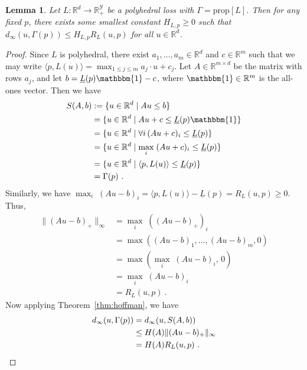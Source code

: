 \documentclass[11pt]{article}
\newcommand{\reals}{\mathbb{R}}
\newcommand{\prop}[1]{\mathrm{prop}[#1]}
\newcommand{\Y}{\mathcal{Y}}
\newcommand{\risk}[1]{\underline{#1}}
\newcommand{\inprod}[2]{\langle #1, #2 \rangle}%
\newcommand{\ones}{\mathbbm{1}}
\newcommand{\regret}[3]{R_{#1}(#2,#3)}
\newtheorem{lemma}{Lemma}
\begin{document}
\begin{lemma}\label{lemma:hoffman-polyhedral}
  Let $L: \reals^d \to \reals_+^{\Y}$ be a polyhedral loss with $\Gamma = \prop{L}$.
  Then for any fixed $p$, there exists some smallest constant $H_{L,p} \geq 0$ such that $d_{\infty}(u,\Gamma(p)) \leq H_{L,p} R_L(u,p)$ for all $u \in \reals^d$.
\end{lemma}
\begin{proof}
  Since $L$ is polyhedral, there exist $a_1,\ldots,a_m \in \reals^d$ and $c\in\reals^m$ such that we may write $\inprod{p}{L(u)} = \max_{1\leq j\leq m} a_j \cdot u + c_j$.
  Let $A \in \reals^{m\times d}$ be the matrix with rows $a_j$, and let $b = \risk{L}(p)\ones - c$, where $\ones\in\reals^m$ is the all-ones vector.
  Then we have
  \begin{align*}
    S(A,b)
    &:= \{u\in\reals^d \mid A u \leq b\}
    \\
    &= \{u\in\reals^d \mid A u + c \leq \risk{L}(p)\ones\}
    \\
    &= \{u\in\reals^d \mid \forall i\, (A u + c)_i \leq \risk{L}(p)\}
    \\
    &= \{u\in\reals^d \mid \max_i \;(A u + c)_i \leq \risk{L}(p)\}
    \\
    &= \{u\in\reals^d \mid \inprod{p}{L(u)} \leq \risk{L}(p)\}
    \\
    & = \Gamma(p)~.
  \end{align*}
  Similarly, we have $\max_i\; (A u - b)_i = \inprod{p}{L(u)} - \risk{L}(p) = \regret{L}{u}{p} \geq 0$.
  Thus,
  \begin{align*}
    \|(Au - b)_+\|_\infty
    &= \max_i\; ((Au - b)_+)_i
    \\
    &= \max((Au - b)_1,\ldots,(Au - b)_m, 0)
    \\
    &= \max(\max_i\; (Au - b)_i, \, 0)
    \\
    &= \max_i\; (Au - b)_i
    \\
    &= \regret{L}{u}{p}~.
  \end{align*}
  Now applying Theorem~\ref{thm:hoffman}, we have
  \begin{align*}
    d_\infty(u,\Gamma(p))
    &=    d_\infty(u,S(A,b))
    \\
    &\leq H(A) \|(Au-b)_+\|_\infty
    \\
    &= H(A) \regret{L}{u}{p}~.\qedhere
  \end{align*}
\end{proof}
\end{document}
